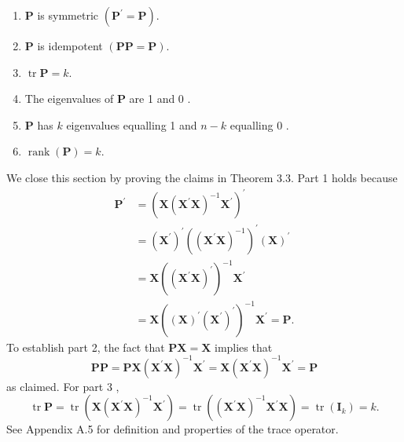 \documentclass[10pt]{article}
\begin{document}
\begin{enumerate}
  \item $\boldsymbol{P}$ is symmetric $\left(\boldsymbol{P}^{\prime}=\boldsymbol{P}\right)$.

  \item $\boldsymbol{P}$ is idempotent $(\boldsymbol{P P}=\boldsymbol{P})$.

  \item $\operatorname{tr} \boldsymbol{P}=k$.

  \item The eigenvalues of $\boldsymbol{P}$ are 1 and 0 .

  \item $\boldsymbol{P}$ has $k$ eigenvalues equalling 1 and $n-k$ equalling 0 .

  \item $\operatorname{rank}(\boldsymbol{P})=k$.

\end{enumerate}
We close this section by proving the claims in Theorem 3.3. Part 1 holds because
$$
\begin{aligned}
\boldsymbol{P}^{\prime} &=\left(\boldsymbol{X}\left(\boldsymbol{X}^{\prime} \boldsymbol{X}\right)^{-1} \boldsymbol{X}^{\prime}\right)^{\prime} \\
&=\left(\boldsymbol{X}^{\prime}\right)^{\prime}\left(\left(\boldsymbol{X}^{\prime} \boldsymbol{X}\right)^{-1}\right)^{\prime}(\boldsymbol{X})^{\prime} \\
&=\boldsymbol{X}\left(\left(\boldsymbol{X}^{\prime} \boldsymbol{X}\right)^{\prime}\right)^{-1} \boldsymbol{X}^{\prime} \\
&=\boldsymbol{X}\left((\boldsymbol{X})^{\prime}\left(\boldsymbol{X}^{\prime}\right)^{\prime}\right)^{-1} \boldsymbol{X}^{\prime}=\boldsymbol{P} .
\end{aligned}
$$
To establish part 2, the fact that $\boldsymbol{P X}=\boldsymbol{X}$ implies that
$$
\boldsymbol{P} \boldsymbol{P}=\boldsymbol{P} \boldsymbol{X}\left(\boldsymbol{X}^{\prime} \boldsymbol{X}\right)^{-1} \boldsymbol{X}^{\prime}=\boldsymbol{X}\left(\boldsymbol{X}^{\prime} \boldsymbol{X}\right)^{-1} \boldsymbol{X}^{\prime}=\boldsymbol{P}
$$
as claimed. For part 3 ,
$$
\operatorname{tr} \boldsymbol{P}=\operatorname{tr}\left(\boldsymbol{X}\left(\boldsymbol{X}^{\prime} \boldsymbol{X}\right)^{-1} \boldsymbol{X}^{\prime}\right)=\operatorname{tr}\left(\left(\boldsymbol{X}^{\prime} \boldsymbol{X}\right)^{-1} \boldsymbol{X}^{\prime} \boldsymbol{X}\right)=\operatorname{tr}\left(\boldsymbol{I}_{k}\right)=k .
$$
See Appendix A.5 for definition and properties of the trace operator.
\end{document}
